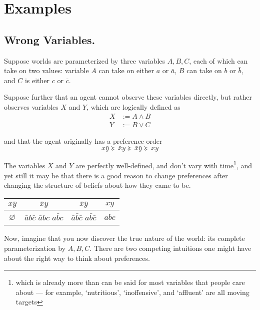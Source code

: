 \documentclass{book}
\newcommand\geqc{\succcurlyeq}
\begin{document}
	\chapter{Examples}
	
	\section{Wrong Variables.}
	Suppose worlds are parameterized by three variables $A, B, C$, each of which can take on two values: variable $A$ can take on either $a$ or $\bar a$, $B$ can take on $b$ or $\bar b$, and $C$ is either $c$ or $\bar c$.
	
	Suppose further that an agent cannot observe these variables directly, but rather observes variables $X$ and $Y$, which are logically defined as 
	\begin{align*}
		X &:= A \land B \\
		Y &:= B \lor C
	\end{align*}
	
	and that the agent originally has a preference order
	\[ x \bar y \geqc \bar x y \geqc \bar x \bar y \geqc x y  \]
	
	The variables $X$ and $Y$ are perfectly well-defined, and don't vary with time\footnote{which is already more than can be said for most variables that people care about --- for example, `nutritious', `inoffensive', and `affluent' are all moving targets}, and yet still it may be that there is a good reason to change preferences after changing the structure of beliefs about how they came to be.
	
	
	
	\begin{center}
		\begin{tabular}{cccc}
			$x \bar y $ & $\bar x y$ & $\bar x \bar y$ & $x y$ \\\hline
			\rule{0pt}{2.3em}$\varnothing$ & \parbox[c]{0.5cm}{$\bar a b \bar c$\\$\bar a b c$ \\ $a \bar b c$} 
				& \parbox[c]{0.5cm}{$\bar a \bar b \bar c$ \\ $a \bar b \bar c$}
				& \parbox[c]{0.5cm}{$abc$} \\[1.3em]\hline
		\end{tabular}
	\end{center}
	\vspace{1em}
	
	
	Now, imagine that you now discover the true nature of the world: its complete parameterization by $A,B,C$. There are two competing intuitions one might have about the right way to think about preferences.
	
\end{document}
